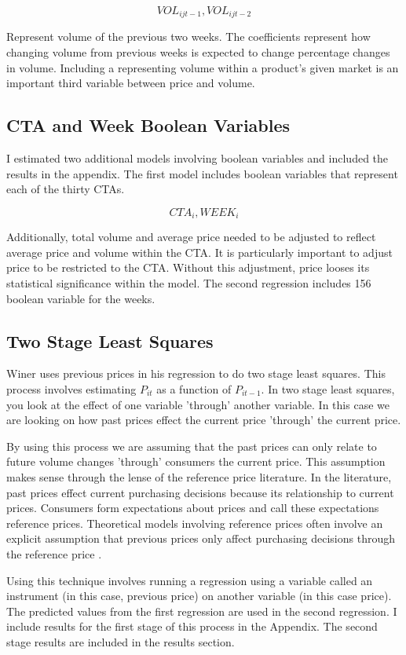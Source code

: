 \documentclass{article}
\begin{document}
$${VOL}_{ijt-1}, {VOL}_{ijt-2} $$

Represent volume of the previous two weeks. The coefficients represent how changing volume from previous weeks is expected to change percentage changes in volume. Including a representing volume within a product's given market is an important third variable between price and volume.

\subsection{CTA and Week Boolean Variables}

I estimated two additional models involving boolean variables and included the results in the appendix. The first model includes boolean variables that represent each of the thirty CTAs.

$$ CTA_i, WEEK_{i}$$

Additionally, total volume and average price needed to be adjusted to reflect average price and volume within the CTA. It is particularly important to adjust price to be restricted to the CTA. Without this adjustment, price looses its statistical significance within the model. The second regression includes 156 boolean variable for the weeks.

\subsection{Two Stage Least Squares}

Winer uses previous prices in his regression to do two stage least squares. This process involves estimating ${P}_{it}$ as a function of ${P}_{it-1}$. In two stage least squares, you look at the effect of one variable 'through' another variable.  In this case we are looking on how past prices effect the current price 'through' the current price. 

By using this process we are assuming that the past prices can only relate to future volume changes 'through' consumers the current price. This assumption makes sense through the lense of the reference price literature. In the literature, past prices effect current purchasing decisions because its relationship to current prices. Consumers form expectations about prices and call these expectations reference prices. Theoretical models involving reference prices often involve an explicit assumption that previous prices only affect purchasing decisions through the reference price \cite{putler}.

Using this technique involves running a regression using a variable called an instrument (in this case, previous price) on another variable (in this case price). The predicted values from the first regression are used in the second regression.  I include results for the first stage of this process in the Appendix. The second stage results are included in the results section.\\
\end{document}
